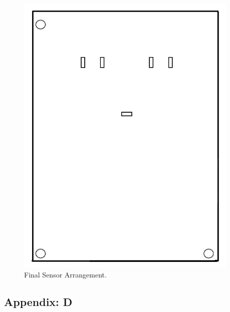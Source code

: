 \begin{figure}[H]
\centering
\includegraphics[width=0.95\textwidth]{figures/sarray3.jpg}
\caption{Final Sensor Arrangement.}
\end{figure}

\newpage
\subsection*{Appendix: D}

